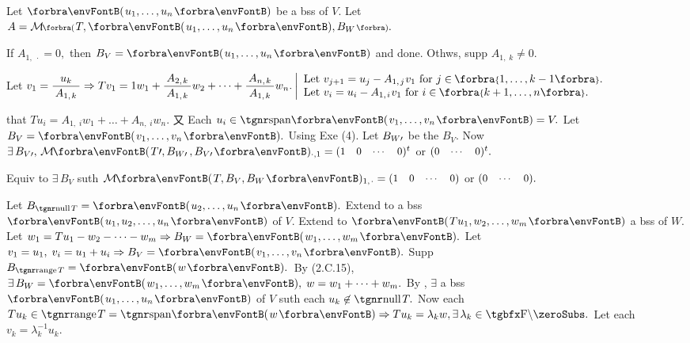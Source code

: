 \par\quad
Let $\Par{u_1,\dots,u_n}$ be a bss of $V$. Let $A=\Mt[\BigPar]{T,\Par{u_1,\dots,u_n},B_W}.$\par\quad
If $A_{1,\;\!\cdot}=0,$ then $B_V=\Par{u_1,\dots,u_n}$ and done. Othws, supp $A_{1,\;\!k}\neq 0.$\par\quad
Let $v_1={\displaystyle{\frac{u_k}{\:A_{1,\;\!k}\:}}}\Rightarrow Tv_1=1w_1+{\displaystyle{\frac{\:A_{2,\;\!k}\:}{A_{1,\;\!k}}}}w_2+\dots+{\displaystyle{\frac{\:A_{n,\;\!k}\:}{A_{1,\;\!k}}}}w_n.$\;$\MathLeftMid{l}{$
	\!\!Let $v_{j+1}=u_{j}-A_{1,\;\!j}\:\!v_1$ for $j\in\;\!\!\Bra{1,\dots,k-1}.\\$
	\!\!Let $v_i=u_i-A_{1,\;\!i}\:\!v_1$ for $i\in\;\!\!\Bra{k+1,\dots,n}.}$\vspace{4pt}\par\quad
\NOTICE that $Tu_i=A_{1,\;\!i}w_1+\dots+A_{n,\;\!i}w_n.$ 又 Each $u_i\in\Span{v_1,\dots,v_n}=V.$ Let $B_V=\Par{v_1,\dots,v_n}.$\PfEnd\vspace{6pt}\quad
\Or Using Exe (4). Let $B_{W\prime}$ be the $B_V.$ Now $\exists\,B_{V\apostrophe},\,\Mt{T\apostrophe,B_{W\apostrophe}\,,B_{V\apostrophe}}{_{\cdot,1}}={\small\begin{pmatrix}1&0&\cdots&0\end{pmatrix}}{^t}$ or ${\small\begin{pmatrix}0&\cdots&0\end{pmatrix}}{^t}.$\par\quad
Equiv to $\exists\,B_V$  suth $\Mt{T,B_V,B_W}{_{1,\;\!\cdot}}={\small\begin{pmatrix}1&0&\cdots&0\end{pmatrix}}$ or ${\small\begin{pmatrix}0&\cdots&0\end{pmatrix}}.$\PfEnd
\SepLine\pagebreak

Let $B_{\null T}=\Par{u_2,\dots,u_n}.$ Extend to a bss $\Par{u_1,u_2,\dots,u_n}$ of $V.$\parSol{}
Extend to $\Par{Tu_1,w_2,\dots,w_m}$ a bss of $W.$ Let $w_1=Tu_1-w_2-\dots-w_m\Rightarrow B_W=\Par{w_1,\dots,w_m}.$\parSol{}
Let \,$v_1=u_1,\;v_i=u_1+u_i\Rightarrow B_V=\Par{v_1,\dots,v_n}.$\PfEnd\vspace{3pt}\parSol{}
\Or Supp $B_{\range T}=\Par{w}.$ \,By {\NOTEFOR} (2.C.15), $\exists\,B_W=\Par{w_1,\dots,w_m},\;w=w_1+\dots+w_m.$\parSol{}
By , $\exists$ a bss $\Par{u_1,\dots,u_n}$ of $V$ suth each $u_k\not\in\null T.$\parSol{}
Now each $Tu_k\in\range T=\Span{w}\Rightarrow Tu_k=\lambda_k w,\exists\,\lambda_k\in\nonzeroFbb.$ Let each $v_k=\lambda_k^{-1}u_k.$\PfEnd
\SepLine

